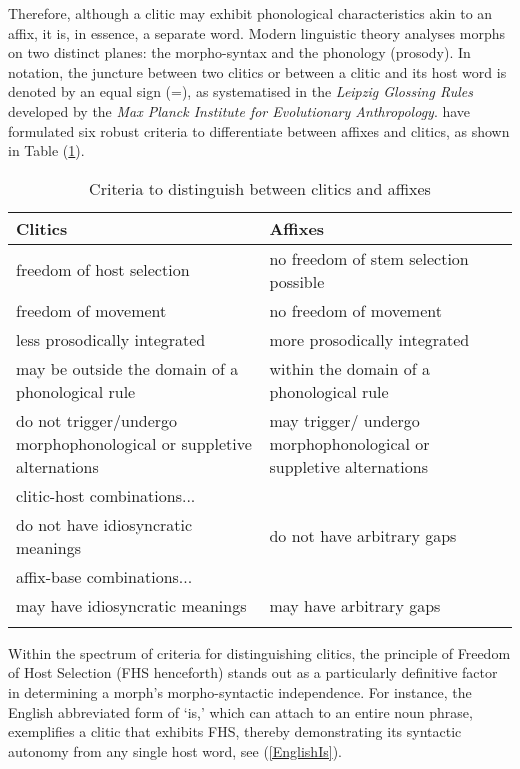\documentclass[output=paper,colorlinks,citecolor=brown ,chinesefont]{langscibook}
\begin{document}
Therefore, although a clitic may exhibit phonological characteristics akin to an affix, it is, in essence, a separate word. Modern linguistic theory analyses morphs on two distinct planes: the morpho-syntax and the phonology (prosody). In notation, the juncture between two clitics or between a clitic and its host word is denoted by an equal sign (=), as systematised in the \textit{Leipzig Glossing Rules} developed by the \textit{Max Planck Institute for Evolutionary Anthropology}.  \citet{haspelmathsims} have formulated six robust criteria to differentiate between affixes and clitics, as shown in Table (\ref{tab:clitic}).

\begin{table}
    \centering
    \begin{tabular}{m{} m{}}\lsptoprule
     Clitics	 & Affixes \\ \midrule
    freedom of host selection & 	no freedom of stem selection possible \\
    freedom of movement	& no freedom of movement  \\
    less prosodically integrated & more prosodically integrated \\
    may be outside the domain of a phonological rule & within the domain of a phonological rule \\
  do not trigger/undergo morphophonological or suppletive alternations	& may trigger/ undergo morphophonological or suppletive alternations \\
  \multicolumn{2}{l}{clitic-host combinations...} \\   do not have idiosyncratic meanings
   & do not have arbitrary gaps \\
     \multicolumn{2}{l}{affix-base combinations... } \\
      may have idiosyncratic meanings &   may have arbitrary gaps\\ \lspbottomrule
    \end{tabular}
    \caption{Criteria to distinguish between clitics and affixes \citep[202]{haspelmathsims}}
    \label{tab:clitic}
\end{table}


Within the spectrum of criteria for distinguishing clitics, the principle of Freedom of Host Selection (FHS henceforth) stands out as a particularly definitive factor in determining a morph’s morpho-syntactic independence. For instance, the English abbreviated form of ‘is,' which can attach to an entire noun phrase, exemplifies a clitic that exhibits FHS, thereby demonstrating its syntactic autonomy from any single host word, see (\ref{EnglishIs}).
\end{document}
